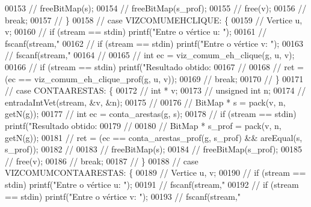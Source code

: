 \begin{DoxyCode}
{{{{{{00153 \textcolor{comment}{//              freeBitMap(s);}
00154 \textcolor{comment}{//              freeBitMap(s\_prof);}
00155 \textcolor{comment}{//              free(v);}
00156 \textcolor{comment}{//              break;}
00157 \textcolor{comment}{//      \}}
00158 \textcolor{comment}{//      case VIZCOMUMEHCLIQUE: \{}
00159 \textcolor{comment}{//              Vertice u, v;}
00160 \textcolor{comment}{//              if (stream == stdin) printf("Entre o vértice u: ");}
00161 \textcolor{comment}{//              fscanf(stream,"%
00162 \textcolor{comment}{//              if (stream == stdin) printf("Entre o vértice v: ");}
00163 \textcolor{comment}{//              fscanf(stream,"%
00164 \textcolor{comment}{//}
00165 \textcolor{comment}{//              int ec = viz\_comum\_eh\_clique(g, u, v);}
00166 \textcolor{comment}{//              if (stream == stdin) printf("Resultado obtido: %
00167 \textcolor{comment}{//}
00168 \textcolor{comment}{//              ret = (ec == viz\_comum\_eh\_clique\_prof(g, u, v));}
00169 \textcolor{comment}{//              break;}
00170 \textcolor{comment}{//      \}}
00171 \textcolor{comment}{//      case CONTAARESTAS: \{}
00172 \textcolor{comment}{//              int * v;}
00173 \textcolor{comment}{//              unsigned int n;}
00174 \textcolor{comment}{//              entradaIntVet(stream, &v, &n);}
00175 \textcolor{comment}{//}
00176 \textcolor{comment}{//              BitMap * s = pack(v, n, getN(g));}
00177 \textcolor{comment}{//              int ec = conta\_arestas(g, s);}
00178 \textcolor{comment}{//              if (stream == stdin) printf("Resultado obtido: %
00179 \textcolor{comment}{//}
00180 \textcolor{comment}{//              BitMap * s\_prof = pack(v, n, getN(g));}
00181 \textcolor{comment}{//              ret = (ec == conta\_arestas\_prof(g, s\_prof) && areEqual(s, s\_prof));}
00182 \textcolor{comment}{//}
00183 \textcolor{comment}{//              freeBitMap(s);}
00184 \textcolor{comment}{//              freeBitMap(s\_prof);}
00185 \textcolor{comment}{//              free(v);}
00186 \textcolor{comment}{//              break;}
00187 \textcolor{comment}{//      \}}
00188 \textcolor{comment}{//      case VIZCOMUMCONTAARESTAS: \{}
00189 \textcolor{comment}{//              Vertice u, v;}
00190 \textcolor{comment}{//              if (stream == stdin) printf("Entre o vértice u: ");}
00191 \textcolor{comment}{//              fscanf(stream,"%
00192 \textcolor{comment}{//              if (stream == stdin) printf("Entre o vértice v: ");}
00193 \textcolor{comment}{//              fscanf(stream,"%
}}}}}}}}}}}}
\end{DoxyCode}
